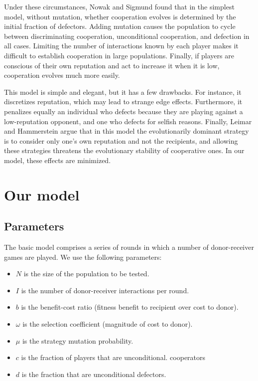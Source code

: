 \documentclass{amsart}
\begin{document}
Under these circumstances, Nowak and Sigmund found that in the
simplest model, without mutation, whether cooperation evolves is
determined by the initial fraction of defectors. Adding mutation
causes the population to cycle between discriminating cooperation,
unconditional cooperation, and defection in all cases. Limiting the
number of interactions known by each player makes it difficult to
establish cooperation in large populations. Finally, if players are
conscious of their own reputation and act to increase it when it is
low, cooperation evolves much more easily.

This model is simple and elegant, but it has a few drawbacks. For
instance, it discretizes reputation, which may lead to strange edge
effects. Furthermore, it penalizes equally an individual who defects
because they are playing against a low-reputation opponent, and one
who defects for selfish reasons. Finally, Leimar and Hammerstein
\cite{leimar_evolution_2001} argue that in this model the
evolutionarily dominant strategy is to consider only one's own
reputation and not the recipients, and allowing these strategies
threatens the evolutionary stability of cooperative ones. In our
model, these effects are minimized.

\section{Our model}
\label{sec:model}

\subsection{Parameters}

The basic model comprises a series of rounds in which a number of
donor-receiver games are played. We use the following parameters:

\begin{itemize}
\item $N$ is the size of the population to be tested.
\item $I$ is the number of donor-receiver interactions per round.
\item $b$ is the benefit-cost ratio (fitness benefit to recipient over
  cost to donor).
\item $\omega$ is the selection coefficient (magnitude of cost to
  donor).
\item $\mu$ is the strategy mutation probability.
\item $c$ is the fraction of players that are unconditional.
  cooperators
\item $d$ is the fraction that are unconditional defectors.
\end{itemize}
\end{document}
